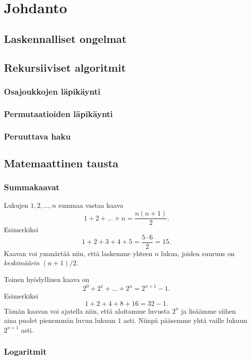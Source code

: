 \chapter{Johdanto}

\section{Laskennalliset ongelmat}

\section{Rekursiiviset algoritmit}

\subsection{Osajoukkojen läpikäynti}

\subsection{Permutaatioiden läpikäynti}

\subsection{Peruuttava haku}

\section{Matemaattinen tausta}

\subsection{Summakaavat}

Lukujen $1,2,\dots,n$ summaa vastaa kaava
\[1+2+\dots+n = \frac{n(n+1)}{2}.\]
Esimerkiksi
\[1+2+3+4+5 = \frac{5 \cdot 6}{2}=15.\]
Kaavan voi ymmärtää niin, että laskemme yhteen $n$ lukua,
joiden suuruus on \emph{keskimäärin} $(n+1)/2$.

Toinen hyödyllinen kaava on
\[2^0+2^1+\dots+2^n = 2^{n+1}-1.\]
Esimerkiksi
\[1+2+4+8+16=32-1.\]
Tämän kaavan voi ajatella niin, että aloitamme luvusta $2^n$
ja lisäämme siihen aina puolet pienemmän luvun lukuun $1$ asti.
Niinpä pääsemme yhtä vaille lukuun $2^{n+1}$ asti.

\subsection{Logaritmit}

